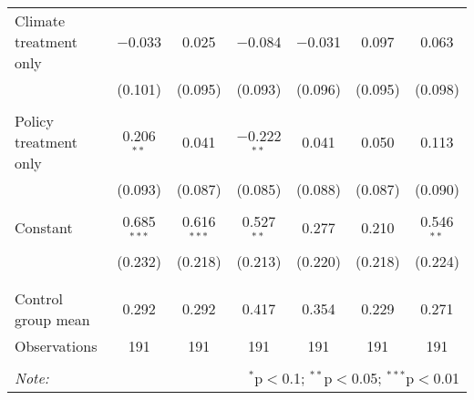 \begin{tabular}{@{\extracolsep{5pt}}lcccccc}
 Climate treatment only & $-$0.033 & 0.025 & $-$0.084 & $-$0.031 & 0.097 & 0.063 \\ 
  & (0.101) & (0.095) & (0.093) & (0.096) & (0.095) & (0.098) \\ 
  & & & & & & \\ 
 Policy treatment only & 0.206$^{**}$ & 0.041 & $-$0.222$^{**}$ & 0.041 & 0.050 & 0.113 \\ 
  & (0.093) & (0.087) & (0.085) & (0.088) & (0.087) & (0.090) \\ 
  & & & & & & \\ 
 Constant & 0.685$^{***}$ & 0.616$^{***}$ & 0.527$^{**}$ & 0.277 & 0.210 & 0.546$^{**}$ \\ 
  & (0.232) & (0.218) & (0.213) & (0.220) & (0.218) & (0.224) \\ 
  & & & & & & \\ 
\hline \\[-1.8ex] 
Control group mean & 0.292 & 0.292 & 0.417 & 0.354 & 0.229 & 0.271 \\ 
Observations & 191 & 191 & 191 & 191 & 191 & 191 \\ 
\hline 
\hline \\[-1.8ex] 
\textit{Note:}  & \multicolumn{6}{r}{$^{*}$p$<$0.1; $^{**}$p$<$0.05; $^{***}$p$<$0.01} \\ 
\end{tabular} 
